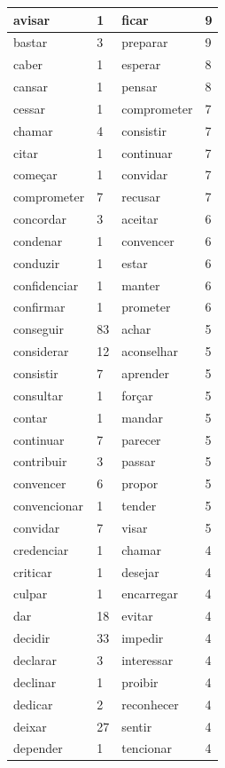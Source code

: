 \documentclass[output=paper,colorlinks,citecolor=brown]{langscibook}
\begin{document}
\begin{longtable}{ p{3cm} | p{1cm} | p{3cm} | p{1cm} }
			avisar & 1 & ficar & 9\\\hline
			bastar & 3 & preparar & 9\\\hline
			caber & 1 & esperar & 8\\\hline
			cansar & 1 & pensar & 8\\\hline
			cessar & 1 & comprometer & 7\\\hline
			chamar & 4 & consistir & 7\\\hline
			citar & 1 & continuar & 7\\\hline
			começar & 1 & convidar & 7\\\hline
			comprometer & 7 & recusar & 7\\\hline
			concordar & 3 & aceitar & 6\\\hline
			condenar & 1 & convencer & 6\\\hline
			conduzir & 1 & estar & 6\\\hline
			confidenciar & 1 & manter & 6\\\hline
			confirmar & 1 & prometer & 6\\\hline
			conseguir & 83 & achar & 5\\\hline
			considerar & 12 & aconselhar & 5\\\hline
			consistir & 7 & aprender & 5\\\hline
			consultar & 1 & forçar & 5\\\hline
			contar & 1 & mandar & 5\\\hline
			continuar & 7 & parecer & 5\\\hline
			contribuir & 3 & passar & 5\\\hline
			convencer & 6 & propor & 5\\\hline
			convencionar & 1 & tender & 5\\\hline
			convidar & 7 & visar & 5\\\hline
			credenciar & 1 & chamar & 4\\\hline
			criticar & 1 & desejar & 4\\\hline
			culpar & 1 & encarregar & 4\\\hline
			dar & 18 & evitar & 4\\\hline
			decidir & 33 & impedir & 4\\\hline
			declarar & 3 & interessar & 4\\\hline
			declinar & 1 & proibir & 4\\\hline
			dedicar & 2 & reconhecer & 4\\\hline
			deixar & 27 & sentir & 4\\\hline
			depender & 1 & tencionar & 4\\\hline

\end{longtable}
\end{document}
